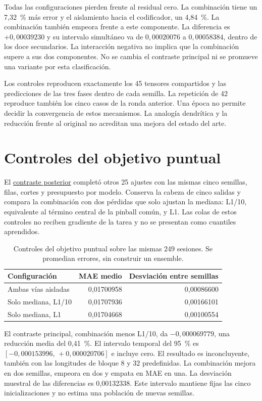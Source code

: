 \documentclass[11pt,a4paper]{report}
\begin{document}
Todas las configuraciones pierden frente al residual cero. La combinación
tiene un 7,32~\% más error y el aislamiento hacia el codificador, un 4,84~\%.
La combinación también empeora frente a este componente. La diferencia es
$+0{,}00039230$ y su intervalo simultáneo va de $0{,}00020076$ a
$0{,}00058384$, dentro de los doce secundarios.
La interacción negativa no implica que la combinación
supere a sus dos componentes. No se cambia el contraste principal ni se
promueve una variante por esta clasificación.

Los controles reproducen exactamente los 45 tensores compartidos y las
predicciones de las tres fases dentro de cada semilla. La repetición de 42
reproduce también los cinco casos de la ronda anterior. Una época no permite
decidir la convergencia de estos mecanismos. La analogía dendrítica y la
reducción frente al original no acreditan una mejora del estado del arte.

\section{Controles del objetivo puntual}
El \href{https://github.com/GonxKZ/mars-titan/tree/develop/reports/research/point-loss-controls-20261020/development-v1}{contraste posterior}
completó otros 25 ajustes con las mismas cinco semillas, filas, cortes y
presupuesto por modelo. Conserva la cabeza de cinco salidas y compara la
combinación con dos pérdidas que solo ajustan la mediana: L1/10, equivalente
al término central de la pinball común, y L1. Las colas de estos controles
no reciben gradiente de la tarea y no se presentan como cuantiles aprendidos.

\begin{table}[htbp]
\centering
\small
\begin{tabular}{lrr}
\toprule
Configuración & MAE medio & Desviación entre semillas \\
\midrule
Ambas vías aisladas & 0,01700958 & 0,00086600 \\
Solo mediana, L1/10 & 0,01707936 & 0,00166101 \\
Solo mediana, L1 & 0,01704668 & 0,00100554 \\
\bottomrule
\end{tabular}
\caption{Controles del objetivo puntual sobre las mismas 249 sesiones.
Se promedian errores, sin construir un ensemble.}
\end{table}

El contraste principal, combinación menos L1/10, da $-0{,}000069779$,
una reducción media del 0,41~\%. El intervalo temporal del 95~\% es
$[-0{,}000153996,\,+0{,}000020706]$ e incluye cero. El resultado es
inconcluyente, también con las longitudes de bloque 8 y 32 predefinidas.
La combinación mejora en dos semillas, empeora en dos y empata en MAE en una.
La desviación muestral de las diferencias es 0,00132338. Este intervalo
mantiene fijas las cinco inicializaciones y no estima una población de
nuevas semillas.
\end{document}
